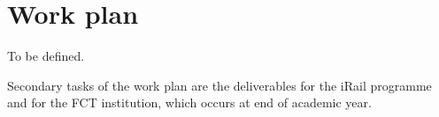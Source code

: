 \section{Work plan}
\label{sec:44}

To be defined.

Secondary tasks of the work plan are the deliverables for the iRail programme and for the FCT institution, which occurs at end of academic year. 


